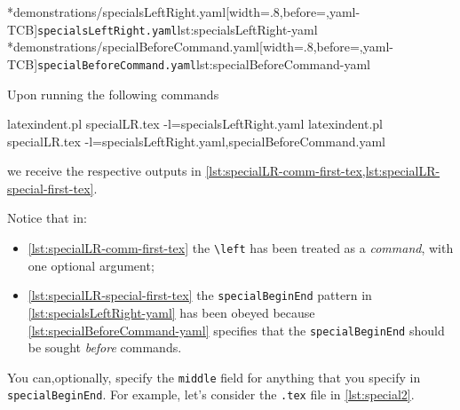 	\begin{cmhtcbraster}
		\cmhlistingsfromfile[]*{demonstrations/specialsLeftRight.yaml}[width=.8\linewidth,before=\centering,yaml-TCB]{\texttt{specialsLeftRight.yaml}}{lst:specialsLeftRight-yaml}
		\cmhlistingsfromfile[]*{demonstrations/specialBeforeCommand.yaml}[width=.8\linewidth,before=\centering,yaml-TCB]{\texttt{specialBeforeCommand.yaml}}{lst:specialBeforeCommand-yaml}
	\end{cmhtcbraster}

	Upon running the following commands
	\begin{widepage}
		\begin{commandshell}
latexindent.pl specialLR.tex -l=specialsLeftRight.yaml      
latexindent.pl specialLR.tex -l=specialsLeftRight.yaml,specialBeforeCommand.yaml      
\end{commandshell}
	\end{widepage}
	we receive the respective outputs in
	\cref{lst:specialLR-comm-first-tex,lst:specialLR-special-first-tex}.

	\begin{minipage}{.49\linewidth}
	\end{minipage}
	\hfill
	\begin{minipage}{.49\linewidth}
	\end{minipage}

	Notice that in:
	\begin{itemize}
		\item \cref{lst:specialLR-comm-first-tex} the \lstinline!\left! has been treated as a
		      \emph{command}, with one optional argument;
		\item \cref{lst:specialLR-special-first-tex} the \texttt{specialBeginEnd} pattern in
		      \cref{lst:specialsLeftRight-yaml}
		      has been obeyed because \cref{lst:specialBeforeCommand-yaml} specifies that the
		      \texttt{specialBeginEnd} should be sought \emph{before} commands.
	\end{itemize}

	You can,optionally, specify%
	 the \texttt{middle} field for anything that you specify in
	\texttt{specialBeginEnd}. For example, let's consider the \texttt{.tex} file in
	\cref{lst:special2}.

